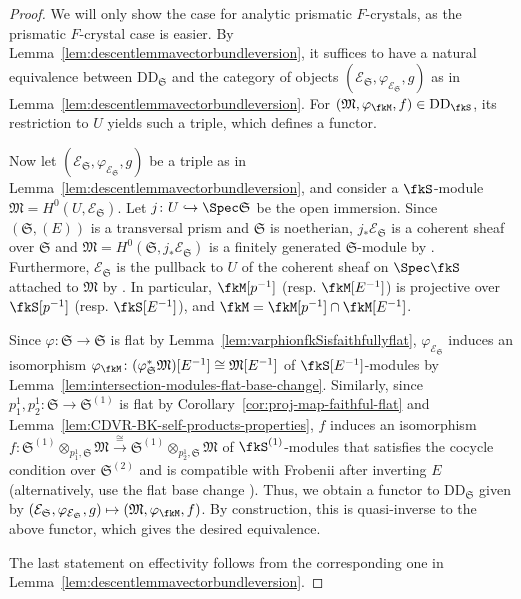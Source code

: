 \begin{proof}
We will only show the case for analytic prismatic $F$-crystals, as the prismatic $F$-crystal case is easier. By Lemma~\ref{lem:descentlemmavectorbundleversion}, it suffices to have a natural equivalence between $\mathrm{DD}_{\mathfrak{S}}$ and the category of objects $(\mathcal{E}_{\mathfrak{S}}, \varphi_{\mathcal{E}_{\mathfrak{S}}}, g)$ as in Lemma~\ref{lem:descentlemmavectorbundleversion}. For $(\mathfrak{M}, \varphi_\fkM, f)\in \mathrm{DD}_\fkS$, its restriction to $U$ yields such a triple, which defines a functor. 

Now let $(\mathcal{E}_{\mathfrak{S}}, \varphi_{\mathcal{E}_{\mathfrak{S}}}, g)$ be a triple as in Lemma~\ref{lem:descentlemmavectorbundleversion}, and consider a $\fkS$-module $\mathfrak{M} = H^0(U, \mathcal{E}_{\mathfrak{S}})$. Let $j\colon U \hookrightarrow \Spec\mathfrak{S}$ be the open immersion. Since $(\mathfrak{S}, (E))$ is a transversal prism and $\mathfrak{S}$ is noetherian, $j_\ast \mathcal{E}_{\mathfrak{S}}$ is a coherent sheaf over $\mathfrak{S}$ and $\mathfrak{M} = H^0(\mathfrak{S}, j_\ast \mathcal{E}_{\mathfrak{S}})$ is a finitely generated $\mathfrak{S}$-module by \cite[Lem.~5.8]{GuoReinecke-Ccris}. Furthermore, $\mathcal{E}_{\mathfrak{S}}$ is the pullback to $U$ of the coherent sheaf on $\Spec \fkS$ attached to $\mathfrak{M}$ by \cite[Tag~0BK0]{stacks-project}. In particular, $\fkM[p^{-1}]$ (resp. $\fkM[E^{-1}]$) is projective over $\fkS[p^{-1}]$ (resp. $\fkS[E^{-1}]$), and $\fkM = \fkM[p^{-1}]\cap \fkM[E^{-1}]$. 

Since $\varphi\colon \mathfrak{S} \rightarrow \mathfrak{S}$ is flat by Lemma~\ref{lem:varphionfkSisfaithfullyflat}, $\varphi_{\mathcal{E}_{\mathfrak{S}}}$ induces an isomorphism $\varphi_\fkM\colon (\varphi_{\mathfrak{S}}^\ast\mathfrak{M})[E^{-1}] \cong \mathfrak{M}[E^{-1}]$ of $\fkS[E^{-1}]$-modules by Lemma~\ref{lem:intersection-modules-flat-base-change}. Similarly, since $p^1_1, p^1_2\colon \mathfrak{S} \rightarrow \mathfrak{S}^{(1)}$ is flat by Corollary~\ref{cor:proj-map-faithful-flat} and Lemma~\ref{lem:CDVR-BK-self-products-properties}, $f$ induces an isomorphism $f\colon \mathfrak{S}^{(1)}\otimes_{p^1_1,\mathfrak{S}}\mathfrak{M}\xrightarrow{\cong}\mathfrak{S}^{(1)}\otimes_{p^1_2,\mathfrak{S}}\mathfrak{M}$ of $\fkS^{(1)}$-modules that satisfies the cocycle condition over $\mathfrak{S}^{(2)}$ and is compatible with Frobenii after inverting $E$ (alternatively, use the flat base change \cite[Tag~02KH]{stacks-project}). Thus, we obtain a functor to $\mathrm{DD}_{\mathfrak{S}}$ given by $(\mathcal{E}_{\mathfrak{S}}, \varphi_{\mathcal{E}_{\mathfrak{S}}}, g)\mapsto(\mathfrak{M}, \varphi_\fkM, f)$.
By construction, this is quasi-inverse to the above functor, which gives the desired equivalence.

The last statement on effectivity follows from the corresponding one in Lemma~\ref{lem:descentlemmavectorbundleversion}.
\end{proof}

